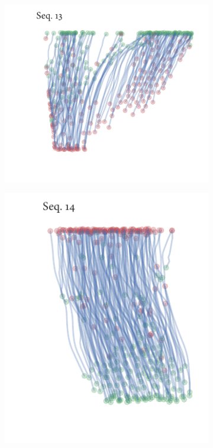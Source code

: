 \begin{figure}[h]
	\begin{subfigure}[t]{0.5\textwidth}
		\centering
		\includegraphics{streamline_sequence13.pdf}
	\end{subfigure}%
	\begin{subfigure}[t]{0.5\textwidth}
		\centering
		\includegraphics{streamline_sequence14.pdf}
	\end{subfigure}
	\begin{subfigure}[t]{0.5\textwidth}
		\centering

\end{subfigure}
\end{figure}
